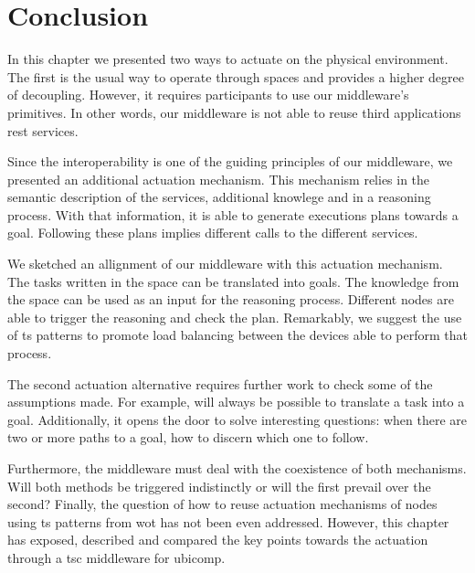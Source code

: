 \section{Conclusion}

In this chapter we presented two ways to actuate on the physical environment.
The first is the usual way to operate through spaces and provides a higher degree of decoupling.
However, it requires participants to use our middleware's primitives.
In other words, our middleware is not able to reuse third applications \ac{rest} services.



Since the interoperability is one of the guiding principles of our middleware, we presented an additional actuation mechanism.
This mechanism relies in the semantic description of the services, additional knowlege and in a reasoning process. %
With that information, it is able to generate executions plans towards a goal.
Following these plans implies different calls to the different services.


We sketched an allignment of our middleware with this actuation mechanism.
The tasks written in the space can be translated into goals.
The knowledge from the space can be used as an input for the reasoning process.
Different nodes are able to trigger the reasoning and check the plan.
Remarkably, we suggest the use of \ac{ts} patterns to promote load balancing between the devices able to perform that process.


The second actuation alternative requires further work to check some of the assumptions made.
For example, will always be possible to translate a task into a goal.
Additionally, it opens the door to solve interesting questions: when there are two or more paths to a goal, how to discern which one to follow.


Furthermore, the middleware must deal with the coexistence of both mechanisms.
Will both methods be triggered indistinctly or will the first prevail over the second?
Finally, the question of how to reuse actuation mechanisms of nodes using \ac{ts} patterns from \ac{wot} has not been even addressed.
However, this chapter has exposed, described and compared the key points towards the actuation through a \ac{tsc} middleware for \ac{ubicomp}.